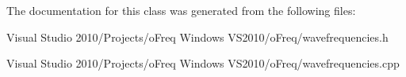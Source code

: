 The documentation for this class was generated from the following files\-:\begin{DoxyCompactItemize}
\item 
Visual Studio 2010/\-Projects/o\-Freq Windows V\-S2010/o\-Freq/wavefrequencies.\-h\item 
Visual Studio 2010/\-Projects/o\-Freq Windows V\-S2010/o\-Freq/wavefrequencies.\-cpp\end{DoxyCompactItemize}
